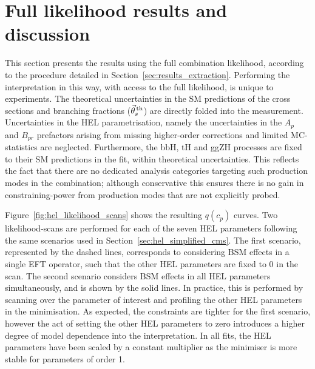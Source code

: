 \section{Full likelihood results and discussion}\label{sec:eft_results}
This section presents the results using the full combination likelihood, according to the procedure detailed in Section~\ref{sec:results_extraction}. Performing the interpretation in this way, with access to the full likelihood, is unique to experiments.
The theoretical uncertainties in the SM predictions of the cross sections and branching fractions ($\vec{\theta}^{\,\rm{th}}_{s}$) are directly folded into the measurement. Uncertainties in the HEL parametrisation, namely the uncertainties in the $A_p$ and $B_{pr}$ prefactors arising from missing higher-order corrections and limited MC-statistics are neglected. Furthermore, the bbH, tH and ggZH processes are fixed to their SM predictions in the fit, within theoretical uncertainties. This reflects the fact that there are no dedicated analysis categories targeting such production modes in the combination; although conservative this ensures there is no gain in constraining-power from production modes that are not explicitly probed.

Figure~\ref{fig:hel_likelihood_scans} shows the resulting $q(c_p)$ curves. Two likelihood-scans are performed for each of the seven HEL parameters following the same scenarios used in Section~\ref{sec:hel_simplified_cms}. The first scenario, represented by the dashed lines, corresponds to considering BSM effects in a single EFT operator, such that the other HEL parameters are fixed to 0 in the scan. The second scenario considers BSM effects in all HEL parameters simultaneously, and is shown by the solid lines. In practice, this is performed by scanning over the parameter of interest and profiling the other HEL parameters in the minimisation. As expected, the constraints are tighter for the first scenario, however the act of setting the other HEL parameters to zero introduces a higher degree of model dependence into the interpretation. In all fits, the HEL parameters have been scaled by a constant multiplier as the minimiser is more stable for parameters of order 1.


